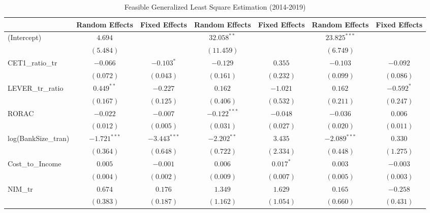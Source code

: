 
\begin{table}
\caption{Feasible Generalized Least Square Estimation (2014-2019)}
\begin{center}
\begin{tabular}{l c c c c c c}
\hline
 & Random Effects & Fixed Effects & Random Effects & Fixed Effects & Random Effects & Fixed Effects \\
\hline
(Intercept)         & $4.694$        &                & $32.058^{**}$  &              & $23.825^{***}$ &               \\
                    & $(5.484)$      &                & $(11.459)$     &              & $(6.749)$      &               \\
CET1\_ratio\_tr     & $-0.066$       & $-0.103^{*}$   & $-0.129$       & $0.355$      & $-0.103$       & $-0.092$      \\
                    & $(0.072)$      & $(0.043)$      & $(0.161)$      & $(0.232)$    & $(0.099)$      & $(0.086)$     \\
LEVER\_tr\_ratio    & $0.449^{**}$   & $-0.227$       & $0.162$        & $-1.021$     & $0.162$        & $-0.592^{*}$  \\
                    & $(0.167)$      & $(0.125)$      & $(0.406)$      & $(0.532)$    & $(0.211)$      & $(0.247)$     \\
RORAC               & $-0.022$       & $-0.007$       & $-0.122^{***}$ & $-0.048$     & $-0.036$       & $0.006$       \\
                    & $(0.012)$      & $(0.005)$      & $(0.031)$      & $(0.027)$    & $(0.020)$      & $(0.011)$     \\
log(BankSize\_tran) & $-1.721^{***}$ & $-3.443^{***}$ & $-2.202^{**}$  & $3.435$      & $-2.089^{***}$ & $0.330$       \\
                    & $(0.364)$      & $(0.648)$      & $(0.722)$      & $(2.334)$    & $(0.448)$      & $(1.275)$     \\
Cost\_to\_Income    & $0.005$        & $-0.001$       & $0.006$        & $0.017^{*}$  & $0.003$        & $-0.003$      \\
                    & $(0.004)$      & $(0.002)$      & $(0.009)$      & $(0.007)$    & $(0.005)$      & $(0.003)$     \\
NIM\_tr             & $0.674$        & $0.176$        & $1.349$        & $1.629$      & $0.165$        & $-0.258$      \\
                    & $(0.383)$      & $(0.187)$      & $(1.162)$      & $(1.054)$    & $(0.660)$      & $(0.431)$     \\

\end{tabular}
\end{center}
\end{table}
